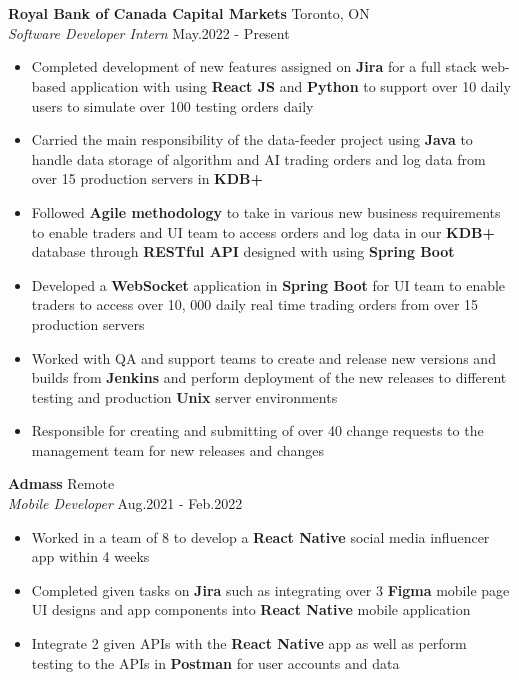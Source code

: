 \documentclass[a4paper]{article}
\newcommand{\lineunder} {
    \vspace*{-8pt} \\
    \hspace*{-18pt} \hrulefill \\
}
\newcommand{\header} [1] {
    {\hspace*{-18pt}\vspace*{6pt} \textsc{#1}}
    \vspace*{-6pt} \lineunder
}
\begin{document}
\header{\textbf{}}
\vspace{1.5mm}
\normalsize
\textbf{Royal Bank of Canada Capital Markets} \hfill Toronto, ON\\
\textit{Software Developer Intern} \hfill May.2022 - Present\\
\vspace{-2mm}
\begin{itemize} \itemsep -2pt
    \item {Completed development of new features assigned on \textbf{Jira} for a full stack web-based application with using \textbf{React JS} and \textbf{Python} to support over 10 daily users to simulate over 100 testing orders daily}
    \item{Carried the main responsibility of the data-feeder project using \textbf{Java} to handle data storage of algorithm and AI trading orders and log data from over 15 production servers in \textbf{KDB+}}
    \item{Followed \textbf{Agile methodology} to take in various new business requirements to enable traders and UI team to access orders and log data in our \textbf{KDB+} database through \textbf{RESTful API} designed with using \textbf{Spring Boot}}
    \item {Developed a \textbf{WebSocket} application in \textbf{Spring Boot} for UI team to enable traders to access over 10, 000 daily real time trading orders from over 15 production servers}
    \item{Worked with QA and support teams to create and release new versions and builds from \textbf{Jenkins} and perform deployment of the new releases to different testing and production \textbf{Unix} server environments}
    \item{Responsible for creating and submitting of over 40 change requests to the management team for new releases and changes}
\end{itemize}

\vspace{-1mm}

\textbf{Admass} \hfill Remote\\
\textit{Mobile Developer} \hfill Aug.2021 - Feb.2022\\
\vspace{-2mm}
\begin{itemize} \itemsep -2pt
	\item{Worked in a team of 8 to develop a \textbf{React Native} social media influencer app within 4 weeks}
    \item{Completed given tasks on \textbf{Jira} such as integrating over 3 \textbf{Figma} mobile page UI designs and app components into \textbf{React Native} mobile application}
	\item{Integrate 2 given APIs with the \textbf{React Native} app as well as perform testing to the APIs in \textbf{Postman} for user accounts and data}
\end{itemize}
\end{document}
